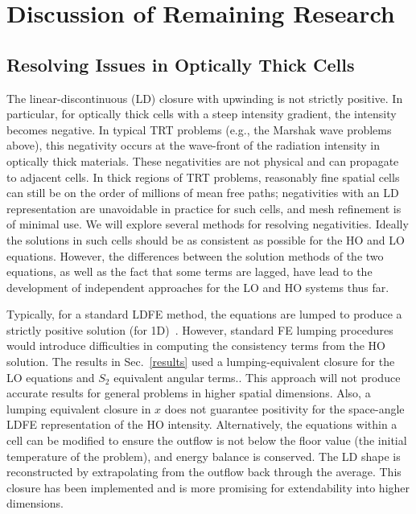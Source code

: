 \documentclass[11pt]{article}
\begin{document}
\section{Discussion of Remaining Research}
\label{sec:prop}



\subsection{Resolving Issues in Optically Thick Cells}
\label{sec:negs}

The linear-discontinuous (LD) closure with upwinding is not strictly positive.  In particular, for
optically thick cells with a steep intensity gradient, the intensity becomes
negative. In typical TRT problems (e.g., the Marshak wave problems above), this negativity occurs at the wave-front of the
radiation intensity in optically thick materials.
These negativities are not physical and can propagate to adjacent cells. In thick regions of
TRT problems, reasonably fine spatial cells can still be on the order of millions of mean
free paths; negativities with an LD representation are unavoidable in practice for
such cells, and mesh refinement is of minimal use.  We will explore several methods
for resolving negativities.  Ideally the solutions in
such cells should be as consistent as possible for the HO and LO equations.  However,
the differences between the solution methods of the two equations, as well as the
fact that some terms are lagged, have lead to the development of independent
approaches for the LO and HO systems thus far.

Typically, for a standard LDFE method,
the equations are lumped to produce a strictly positive solution (for 1D)~\cite{morel_newton}. However, standard FE lumping
procedures would introduce difficulties in computing the consistency terms from the
HO solution.    The results in Sec.~\ref{results} used a lumping-equivalent closure for the LO equations and $S_2$ equivalent angular terms..
This approach will not produce
accurate results for general problems in higher spatial dimensions. Also, a lumping equivalent closure in $x$ does not guarantee positivity for the space-angle LDFE
representation of the HO intensity.
Alternatively, the equations within a cell can be modified to ensure the outflow is not
below the floor value (the initial temperature of the problem), and energy balance is
conserved.  The LD shape is reconstructed by extrapolating from the outflow back
through the average.  This closure has been implemented and is more promising for extendability into higher
dimensions.
\end{document}

